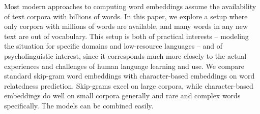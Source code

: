 Most modern approaches to computing word embeddings assume the availability of text corpora with billions of words. In this paper, we explore a setup where only corpora with millions of words are available, and many words in any new text are out of vocabulary. This setup is both of practical interests -- modeling the situation for specific domains and low-resource languages -- and of psycholinguistic interest, since it corresponds much more closely to the actual experiences and challenges of human language learning and use. We compare standard skip-gram word embeddings with character-based embeddings on word relatedness prediction. Skip-grams excel on large corpora, while character-based embeddings do well on small corpora generally and rare and complex words specifically. The models can be combined easily.
